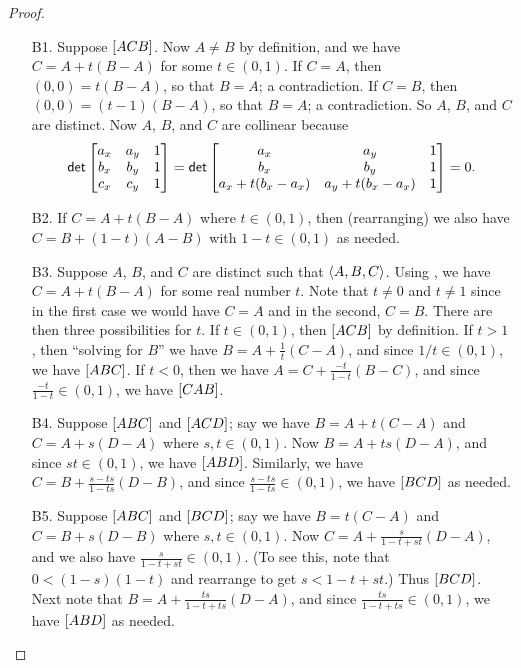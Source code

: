 \begin{proof}\mbox{}
\begin{itemize}
\item[B1.] Suppose \([ A C B ]\).
Now \(A \neq B\) by definition, and we have \(C = A + t(B-A)\) for some \(t \in (0,1)\).
If \(C = A\), then \((0,0) = t(B-A)\), so that \(B = A\); a contradiction.
If \(C = B\), then \((0,0) = (t-1)(B-A)\), so that \(B = A\); a contradiction.
So \(A\), \(B\), and \(C\) are distinct.
Now \(A\), \(B\), and \(C\) are collinear because \[ \mathsf{det} \begin{bmatrix} a_x & a_y & 1 \\ b_x & b_y & 1 \\ c_x & c_y & 1 \end{bmatrix} = \mathsf{det} \begin{bmatrix} a_x & a_y & 1 \\ b_x & b_y & 1 \\ a_x + t(b_x-a_x) & a_y + t(b_x-a_x) & 1 \end{bmatrix} = 0. \]

\item[B2.] If \(C = A + t(B-A)\) where \(t \in (0,1)\), then (rearranging) we also have \(C = B + (1-t)(A-B)\) with \(1-t \in (0,1)\) as needed.

\item[B3.] Suppose \(A\), \(B\), and \(C\) are distinct such that \(\langle A, B, C \rangle\).
Using , we have \(C = A + t(B-A)\) for some real number \(t\).
Note that \(t \neq 0\) and \(t \neq 1\) since in the first case we would have \(C = A\) and in the second, \(C = B\).
There are then three possibilities for \(t\).
If \(t \in (0,1)\), then \([ A C B ]\) by definition.
If \(t > 1\), then ``solving for \(B\)'' we have \(B = A + \frac{1}{t}(C-A)\), and since \(1/t \in (0,1)\), we have \([ A B C ]\).
If \(t < 0\), then we have \(A = C + \frac{-t}{1-t}(B-C)\), and since \(\frac{-t}{1-t} \in (0,1)\), we have \([ C A B ]\).

\item[B4.] Suppose \([ A B C ]\) and \([ A C D ]\); say we have \(B = A + t(C-A)\) and \(C = A + s(D-A)\) where \(s,t \in (0,1)\).
Now \(B = A + ts(D-A)\), and since \(st \in (0,1)\), we have \([ A B D ]\).
Similarly, we have \(C = B + \frac{s-ts}{1-ts}(D-B)\), and since \(\frac{s-ts}{1-ts} \in (0,1)\), we have \([ B C D ]\) as needed.

\item[B5.] Suppose \([ A B C ]\) and \([ B C D ]\); say we have \(B = t(C-A)\) and \(C = B + s(D-B)\) where \(s,t \in (0,1)\).
Now \(C = A + \frac{s}{1-t+st}(D-A)\), and we also have \(\frac{s}{1-t+st} \in (0,1)\).
(To see this, note that \(0 < (1-s)(1-t)\) and rearrange to get \(s < 1-t+st\).)
Thus \([ B C D ]\).
Next note that \(B = A + \frac{ts}{1-t+ts}(D-A)\), and since \(\frac{ts}{1-t+ts} \in (0,1)\), we have \([ A B D ]\) as needed.


\end{itemize}
\end{proof}

